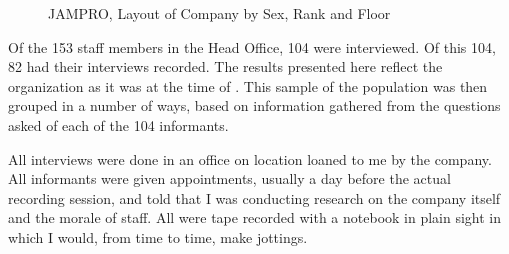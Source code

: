 \begin{figure}
{}
\caption{\label{fig:1.1}JAMPRO, Layout of Company by Sex, Rank and Floor}
\end{figure}

Of the 153 staff members in the Head Office, 104 were interviewed.  Of this 104, 82 had their interviews recorded.  The results presented here reflect the organization as it was at the time of .  This sample of the  population was then grouped in a number of ways, based on information gathered from the questions asked of each of the 104 informants.   

All interviews were done in an office on location loaned to me by the company.  All informants were given appointments, usually a day before the actual recording session, and told that I was conducting research on the company itself and the morale of staff.  All were tape recorded with a notebook in plain sight in which I would, from time to time, make jottings.  

